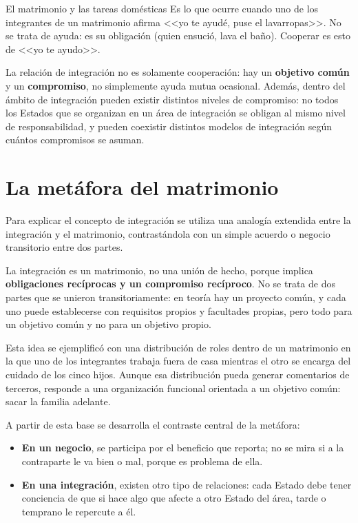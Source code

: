 \documentclass[12pt,oneside]{book}
\begin{document}
\begin{example}{El matrimonio y las tareas domésticas}
Es lo que ocurre cuando uno de los integrantes de un matrimonio afirma <<yo te ayudé, puse el lavarropas>>. No se trata de ayuda: es su obligación (quien ensució, lava el baño). Cooperar es esto de <<yo te ayudo>>.
\end{example}

La relación de integración no es solamente cooperación: hay un \textbf{objetivo común} y un \textbf{compromiso}, no simplemente ayuda mutua ocasional. Además, dentro del ámbito de integración pueden existir distintos niveles de compromiso: no todos los Estados que se organizan en un área de integración se obligan al mismo nivel de responsabilidad, y pueden coexistir distintos modelos de integración según cuántos compromisos se asuman.

\section{La metáfora del matrimonio}
\label{sec:matrimonio}

Para explicar el concepto de integración se utiliza una analogía extendida entre la integración y el matrimonio, contrastándola con un simple acuerdo o negocio transitorio entre dos partes.

\begin{important}
La integración es un matrimonio, no una unión de hecho, porque implica \textbf{obligaciones recíprocas y un compromiso recíproco}. No se trata de dos partes que se unieron transitoriamente: en teoría hay un proyecto común, y cada uno puede establecerse con requisitos propios y facultades propias, pero todo para un objetivo común y no para un objetivo propio.
\end{important}

Esta idea se ejemplificó con una distribución de roles dentro de un matrimonio en la que uno de los integrantes trabaja fuera de casa mientras el otro se encarga del cuidado de los cinco hijos. Aunque esa distribución pueda generar comentarios de terceros, responde a una organización funcional orientada a un objetivo común: sacar la familia adelante.

A partir de esta base se desarrolla el contraste central de la metáfora:

\begin{itemize}
    \item \textbf{En un negocio}, se participa por el beneficio que reporta; no se mira si a la contraparte le va bien o mal, porque es problema de ella.
    \item \textbf{En una integración}, existen otro tipo de relaciones: cada Estado debe tener conciencia de que si hace algo que afecte a otro Estado del área, tarde o temprano le repercute a él.
\end{itemize}
\end{document}
